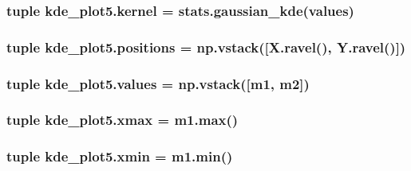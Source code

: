 \subsubsection[{kernel}]{\setlength{\rightskip}{0pt plus 5cm}tuple kde\+\_\+plot5.\+kernel = stats.\+gaussian\+\_\+kde({\bf values})}\label{namespacekde__plot5_a2a73d0d23b62002acd1b8efe02cad412}
\hypertarget{namespacekde__plot5_ab6cfa8207a0b393aa7c934ef92166aee}{}
\subsubsection[{positions}]{\setlength{\rightskip}{0pt plus 5cm}tuple kde\+\_\+plot5.\+positions = np.\+vstack(\mbox{[}X.\+ravel(), Y.\+ravel()\mbox{]})}\label{namespacekde__plot5_ab6cfa8207a0b393aa7c934ef92166aee}
\hypertarget{namespacekde__plot5_a2a7edba4c72b34ae11df3e471ff49c19}{}
\subsubsection[{values}]{\setlength{\rightskip}{0pt plus 5cm}tuple kde\+\_\+plot5.\+values = np.\+vstack(\mbox{[}m1, m2\mbox{]})}\label{namespacekde__plot5_a2a7edba4c72b34ae11df3e471ff49c19}
\hypertarget{namespacekde__plot5_ae089a34b18d3d9436eb7831c060b6905}{}
\subsubsection[{xmax}]{\setlength{\rightskip}{0pt plus 5cm}tuple kde\+\_\+plot5.\+xmax = {\bf m1.\+max}()}\label{namespacekde__plot5_ae089a34b18d3d9436eb7831c060b6905}
\hypertarget{namespacekde__plot5_a3dd7976b4e2ec0f5c0caddd6f3ded904}{}
\subsubsection[{xmin}]{\setlength{\rightskip}{0pt plus 5cm}tuple kde\+\_\+plot5.\+xmin = {\bf m1.\+min}()}\label{namespacekde__plot5_a3dd7976b4e2ec0f5c0caddd6f3ded904}
\hypertarget{namespacekde__plot5_a24bb72e67b6c830730f5ea7b1ef86504}{}
